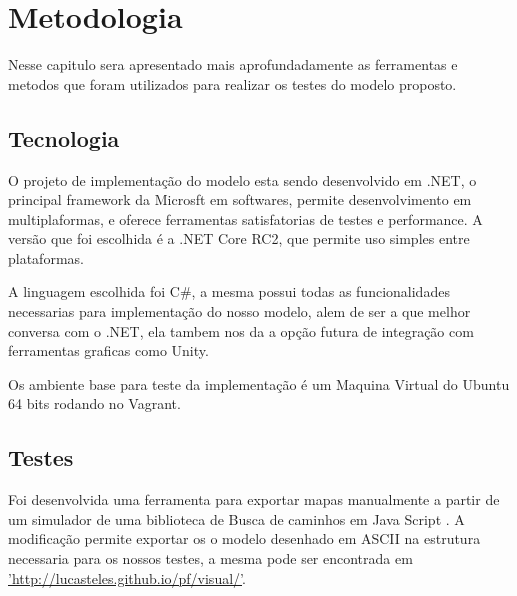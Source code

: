 \chapter[Metodologia]{Metodologia}

Nesse capitulo sera apresentado mais aprofundadamente as ferramentas e metodos que foram utilizados para realizar os testes do modelo proposto.

\section{Tecnologia}

O projeto de implementação do modelo esta sendo desenvolvido em .NET, o principal framework da Microsft em softwares, permite desenvolvimento em multiplaformas, e oferece ferramentas satisfatorias de testes e performance. A versão que foi escolhida é a .NET Core RC2, que permite uso simples entre plataformas.

A linguagem escolhida foi C\#, a mesma possui todas as funcionalidades necessarias para implementação do nosso modelo, alem de ser a que melhor conversa com o .NET, ela tambem nos da a opção futura de integração com ferramentas graficas como Unity.

Os ambiente base para teste da implementação é um Maquina Virtual do Ubuntu 64 bits rodando no Vagrant.


\section{Testes}

Foi desenvolvida uma ferramenta  para exportar mapas  manualmente a partir de um simulador de uma biblioteca de Busca de caminhos em Java Script \cite{Xueqiao}. A modificação permite exportar os o modelo desenhado em ASCII na estrutura necessaria para os nossos testes, a mesma pode ser encontrada em  \hyperref[]{'http://lucasteles.github.io/pf/visual/'}.


